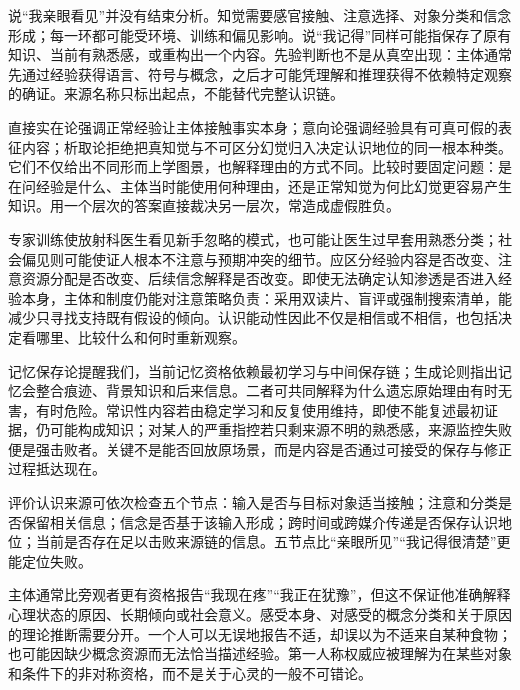 说“我亲眼看见”并没有结束分析。知觉需要感官接触、注意选择、对象分类和信念形成；每一环都可能受环境、训练和偏见影响。说“我记得”同样可能指保存了原有知识、当前有熟悉感，或重构出一个内容。先验判断也不是从真空出现：主体通常先通过经验获得语言、符号与概念，之后才可能凭理解和推理获得不依赖特定观察的确证。来源名称只标出起点，不能替代完整认识链。

直接实在论强调正常经验让主体接触事实本身；意向论强调经验具有可真可假的表征内容；析取论拒绝把真知觉与不可区分幻觉归入决定认识地位的同一根本种类。它们不仅给出不同形而上学图景，也解释理由的方式不同。比较时要固定问题：是在问经验是什么、主体当时能使用何种理由，还是正常知觉为何比幻觉更容易产生知识。用一个层次的答案直接裁决另一层次，常造成虚假胜负。

专家训练使放射科医生看见新手忽略的模式，也可能让医生过早套用熟悉分类；社会偏见则可能使证人根本不注意与预期冲突的细节。应区分经验内容是否改变、注意资源分配是否改变、后续信念解释是否改变。即使无法确定认知渗透是否进入经验本身，主体和制度仍能对注意策略负责：采用双读片、盲评或强制搜索清单，能减少只寻找支持既有假设的倾向。认识能动性因此不仅是相信或不相信，也包括决定看哪里、比较什么和何时重新观察。

记忆保存论提醒我们，当前记忆资格依赖最初学习与中间保存链；生成论则指出记忆会整合痕迹、背景知识和后来信息。二者可共同解释为什么遗忘原始理由有时无害，有时危险。常识性内容若由稳定学习和反复使用维持，即使不能复述最初证据，仍可能构成知识；对某人的严重指控若只剩来源不明的熟悉感，来源监控失败便是强击败者。关键不是能否回放原场景，而是内容是否通过可接受的保存与修正过程抵达现在。

\begin{argumentbox}
评价认识来源可依次检查五个节点：输入是否与目标对象适当接触；注意和分类是否保留相关信息；信念是否基于该输入形成；跨时间或跨媒介传递是否保存认识地位；当前是否存在足以击败来源链的信息。五节点比“亲眼所见”“我记得很清楚”更能定位失败。
\end{argumentbox}

主体通常比旁观者更有资格报告“我现在疼”“我正在犹豫”，但这不保证他准确解释心理状态的原因、长期倾向或社会意义。感受本身、对感受的概念分类和关于原因的理论推断需要分开。一个人可以无误地报告不适，却误以为不适来自某种食物；也可能因缺少概念资源而无法恰当描述经验。第一人称权威应被理解为在某些对象和条件下的非对称资格，而不是关于心灵的一般不可错论。

